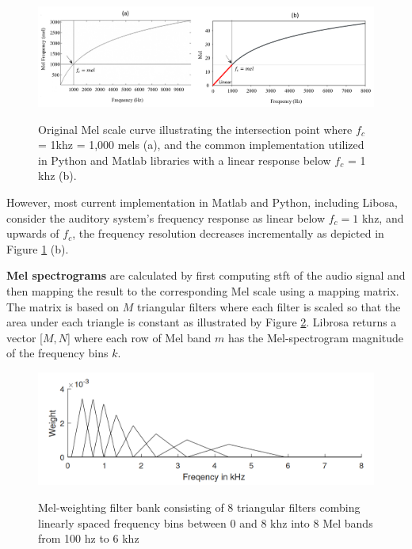 \begin{figure}[htbp]
    \raggedright
        \caption{Original Mel scale curve illustrating the intersection point where $f_c$ = 1\gls{k}\gls{hz} = 1,000 mels (a), and the common implementation utilized in Python and Matlab libraries with a linear response below $f_c$ = 1 \gls{k}\gls{hz} (b).}
        \includegraphics[width=1\textwidth]{resources/images/030-theoretical_framework/Framework_spectral_features_log-mel_scale.png}
        \label{fig:frmwk_spectral_features_mel_scale}
\end{figure}

However, most current implementation in Matlab and Python, including Libosa, consider the auditory system’s frequency response as linear below $f_c = 1$ \gls{k}\gls{hz}, and upwards of $f_c$, the frequency resolution decreases incrementally as depicted in Figure \ref{fig:frmwk_spectral_features_mel_scale} (b). 

\textbf{Mel spectrograms} are calculated by first computing \gls{stft} of the audio signal and then mapping the result to the corresponding Mel scale using a mapping matrix. The matrix is based on $M$ triangular filters where each filter is scaled so that the area under each triangle is constant as illustrated by Figure \ref{fig:frmwk_spectral_features_mel_filter_bank}. Librosa \cite{McFee2015librosa_sw} returns a vector [$M, N$] where each row of Mel band $m$ has the Mel-spectrogram magnitude of the frequency bins $k$.

\begin{figure}[htbp]
    \raggedright
        \caption{Mel-weighting filter bank consisting of 8 triangular filters combing linearly spaced frequency bins between 0 and 8 \gls{k}\gls{hz} into 8 Mel bands from 100 \gls{hz} to 6 \gls{k}\gls{hz}}
        \includegraphics[width=.75\textwidth]{resources/images/030-theoretical_framework/Framework_spectral_features_log-mel_filter_bank.png}
        \label{fig:frmwk_spectral_features_mel_filter_bank}
\end{figure}


